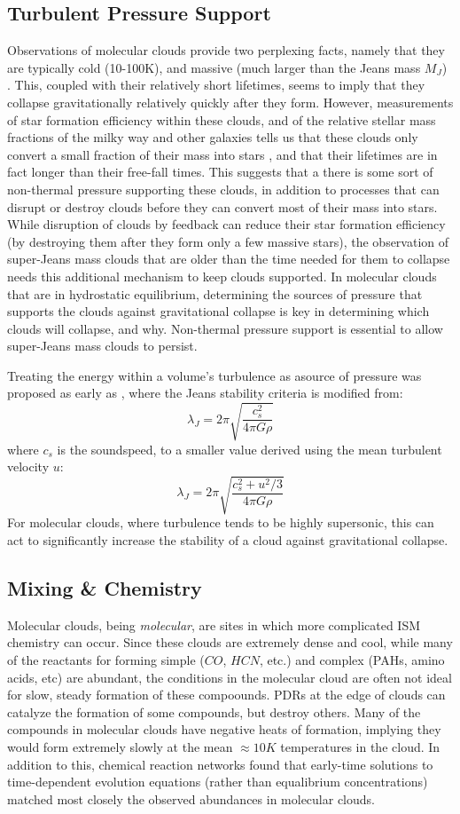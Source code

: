 \documentclass[12pt, preprint]{aastex}
\begin{document}
\subsection{Turbulent Pressure Support}
Observations of molecular clouds provide two perplexing facts, namely that they
are typically cold (10-100K), and massive (much larger than the Jeans mass
$M_J$) \citep{gold1978}.  This, coupled with their relatively short lifetimes,
seems to imply that they collapse gravitationally relatively quickly after they 
form.  However, measurements of star formation efficiency within these clouds,
and of the relative stellar mass fractions of the milky way and other galaxies
tells us that these clouds only convert a small fraction of their mass into
stars \citep{mac2004}, and that their lifetimes are in fact longer than their
free-fall times. This suggests that
a there is some sort of non-thermal pressure supporting these clouds, in
addition to processes that can disrupt or destroy clouds before they can convert
most of their mass into stars. While disruption of clouds by feedback can reduce
their star formation efficiency (by destroying them after they form only a few
massive stars)\citep{hopk2011}, the observation of super-Jeans mass clouds that
are older than the time needed for them to collapse needs this additional
mechanism to keep clouds supported.
In molecular clouds that are in hydrostatic equilibrium, determining the sources
of pressure that supports the clouds against gravitational collapse is key in
determining which clouds will collapse, and why.  Non-thermal pressure support is
essential to allow super-Jeans mass clouds to persist.

Treating the energy within a volume's turbulence as  asource of pressure was
proposed as early as \citet{chandra1951}, where the Jeans stability criteria is
modified from:
$$\lambda_J = 2\pi \sqrt{\frac{c_s^2}{4\pi G\rho}}$$
where $c_s$ is the soundspeed, to a smaller value derived using the mean
turbulent velocity $u$:
$$\lambda_J = 2\pi \sqrt{\frac{c_s^2+u^2/3}{4\pi G\rho}}$$
For molecular clouds, where turbulence tends to be highly supersonic, this can
act to significantly increase the stability of a cloud against gravitational
collapse.
\subsection{Mixing \& Chemistry}
Molecular clouds, being \textit{molecular}, are sites in which more 
complicated ISM chemistry can occur.  Since these clouds are extremely dense and
cool, while many of the reactants for forming simple ($CO$, $HCN$, etc.) and
complex (PAHs, amino acids, etc) are abundant, the conditions in the molecular
cloud are often not ideal for slow, steady formation of these compoounds.
PDRs at the edge of clouds can catalyze the formation of some compounds, but
destroy others.  Many of the compounds in molecular clouds have negative heats
of formation, implying they would form extremely slowly at the mean $\approx
10K$ temperatures in the cloud.  In addition to this, chemical reaction networks
found that early-time solutions to time-dependent evolution equations (rather
than equalibrium concentrations) matched most closely the observed abundances in
molecular clouds\citep{scalo2004}.
\end{document}
